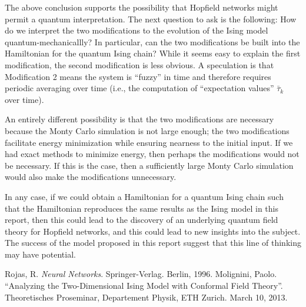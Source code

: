 \documentclass[12pt]{article}
\newcommand{\taubar}{\bar{\tau}}
\begin{document}
The above conclusion supports the possibility that Hopfield networks might permit a quantum interpretation. The next question to ask is the following: How do we interpret the two modifications to the evolution of the Ising model quantum-mechanicallly? In particular, can the two modifications be built into the Hamiltonian for the quantum Ising chain? While it seems easy to explain the first modification, the second modification is less obvious. A speculation is that Modification 2 means the system is ``fuzzy'' in time and therefore requires periodic averaging over time (i.e., the computation of ``expectation values'' $\taubar_k$ over time).

An entirely different possibility is that the two modifications are necessary because the Monty Carlo simulation is not large enough; the two modifications facilitate energy minimization while ensuring nearness to the initial input. If we had exact methods to minimize energy, then perhaps the modifications would not be necessary. 
If this is the case, then a sufficiently large Monty Carlo simulation would also make the modifications unnecessary.

In any case, if we could obtain a Hamiltonian for a quantum Ising chain such that the Hamiltonian reproduces the same results as the Ising model in this report, then this could lead to the discovery of an underlying quantum field theory for Hopfield networks, and this could lead to new insights into the subject. The success of the model proposed in this report suggest that this line of thinking may have potential.

\begin{thebibliography}{9}
Rojas, R. \emph{Neural Networks}. Springer-Verlag. Berlin, 1996.
Molignini, Paolo. ``Analyzing the Two-Dimensional Ising Model with Conformal Field Theory''. Theoretisches Proseminar, Departement Physik, ETH Zurich. March 10, 2013.

\end{thebibliography}
\end{document}
